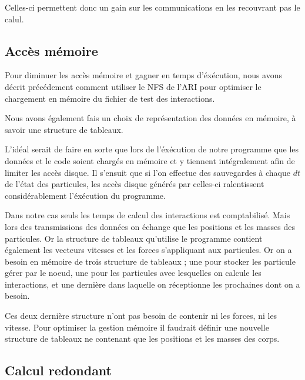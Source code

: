 \par Celles-ci permettent donc un gain sur les communications en les recouvrant pas le calul.\\

\subsection{Accès mémoire}

\par Pour diminuer les accès mémoire et gagner en temps d'éxécution, nous avons décrit précédement
comment utiliser le NFS de l'ARI pour optimiser le chargement en mémoire du fichier de test
des interactions.\\

\par Nous avons également fais un choix de représentation des données en mémoire, à savoir une structure 
de tableaux.\\

\par L'idéal serait de faire en sorte que lors de l'éxécution de notre programme que les données 
et le code soient chargés en mémoire et y tiennent intégralement afin de limiter les accès disque.
Il s'ensuit que si l'on effectue des sauvegardes à chaque $dt$ de l'état des particules, les 
accès disque générés par celles-ci ralentissent considérablement l'éxécution du programme.\\

\par Dans notre cas seuls les temps de calcul des interactions est comptabilisé. Mais lors des 
transmissions des données on échange que les positions et les masses des particules. Or la structure
de tableaux qu'utilise le programme contient également les vecteurs vitesses et les forces s'appliquant 
aux particules. Or on a besoin en mémoire de trois structure de tableaux ; une pour stocker 
les particule gérer par le noeud, une pour les particules avec lesquelles on calcule les 
interactions, et une dernière dans laquelle on réceptionne les prochaines dont on a besoin.\\

\par Ces deux dernière structure n'ont pas besoin de contenir ni les forces, ni les vitesse.
Pour optimiser la gestion mémoire il faudrait définir une nouvelle structure de tableaux 
ne contenant que les positions et les masses des corps.

\subsection{Calcul redondant}

